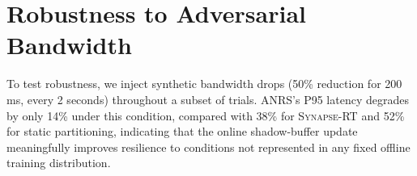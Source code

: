 \section{Robustness to Adversarial Bandwidth}

To test robustness, we inject synthetic bandwidth drops (50\% reduction for 200\,ms, every 2 seconds) throughout a subset of trials. ANRS's P95 latency degrades by only 14\% under this condition, compared with 38\% for \textsc{Synapse-RT} and 52\% for static partitioning, indicating that the online shadow-buffer update meaningfully improves resilience to conditions not represented in any fixed offline training distribution.

